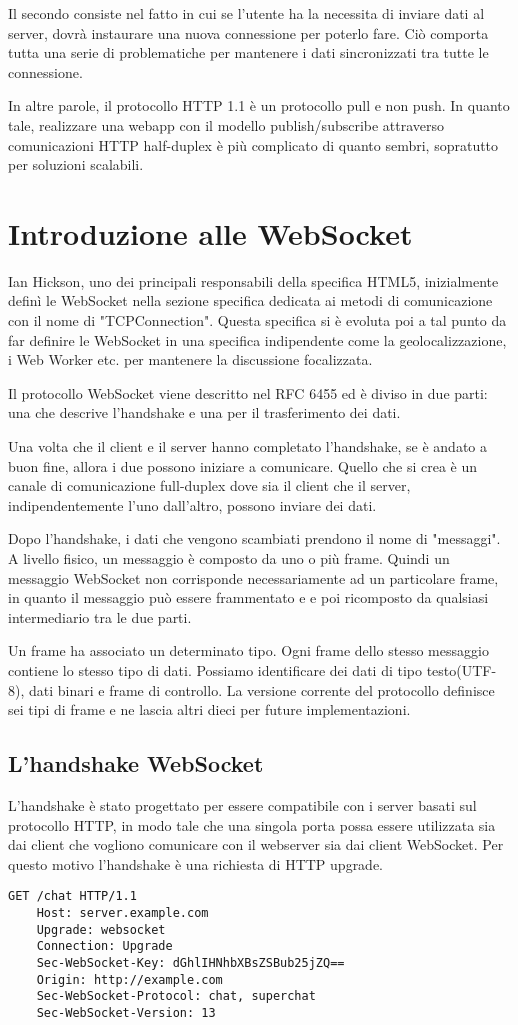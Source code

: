 Il secondo consiste nel fatto in cui se l'utente ha la necessita di inviare dati al server, 
dovrà instaurare una nuova connessione per poterlo fare.
Ciò comporta tutta una serie di problematiche per mantenere i dati
sincronizzati tra tutte le connessione.

In altre parole, il protocollo HTTP 1.1 è un protocollo pull e non push.
In quanto tale, realizzare una webapp con il modello publish/subscribe attraverso comunicazioni HTTP half-duplex è più complicato di quanto sembri, sopratutto per soluzioni scalabili.

\section{Introduzione alle WebSocket}
Ian Hickson, uno dei principali responsabili della specifica HTML5, inizialmente definì le WebSocket nella sezione specifica dedicata ai metodi di comunicazione con il nome di "TCPConnection".
Questa specifica si è evoluta poi a tal punto da far definire le WebSocket in una specifica indipendente come la geolocalizzazione, i Web Worker etc. per mantenere la discussione focalizzata.

Il protocollo WebSocket viene descritto nel RFC 6455 ed è diviso in due parti: una che descrive l'handshake e una per il trasferimento dei dati.

Una volta che il client e il server hanno completato l'handshake, se è andato a buon fine, allora i due possono iniziare a comunicare.
Quello che si crea è un canale di comunicazione full-duplex dove sia il client che il server, indipendentemente l'uno dall'altro, possono inviare dei dati.

Dopo l'handshake, i dati che vengono scambiati prendono il nome di "messaggi". 
A livello fisico, un messaggio è composto da uno o più frame.
Quindi un messaggio WebSocket non corrisponde necessariamente ad un particolare frame, in quanto il messaggio può essere frammentato e e poi ricomposto da qualsiasi intermediario tra le due parti.

Un frame ha associato un determinato tipo. 
Ogni frame dello stesso messaggio contiene lo stesso tipo di dati.
Possiamo identificare dei dati di tipo testo(UTF-8), dati binari e frame di controllo.
La versione corrente del protocollo definisce sei tipi di frame e ne lascia altri dieci per future implementazioni.
\subsection{L'handshake WebSocket}
\label{sec:handshake}
L'handshake è stato progettato per essere compatibile con i server basati sul protocollo HTTP, in modo tale che una singola porta possa essere utilizzata sia dai client che vogliono comunicare con il webserver sia dai client WebSocket.
Per questo motivo l'handshake è una richiesta di HTTP upgrade.
\begin{lstlisting}[caption={client handshake}, style=javaScriptCode]
	GET /chat HTTP/1.1
	Host: server.example.com
	Upgrade: websocket
	Connection: Upgrade
	Sec-WebSocket-Key: dGhlIHNhbXBsZSBub25jZQ==
	Origin: http://example.com
	Sec-WebSocket-Protocol: chat, superchat
	Sec-WebSocket-Version: 13
\end{lstlisting} 

